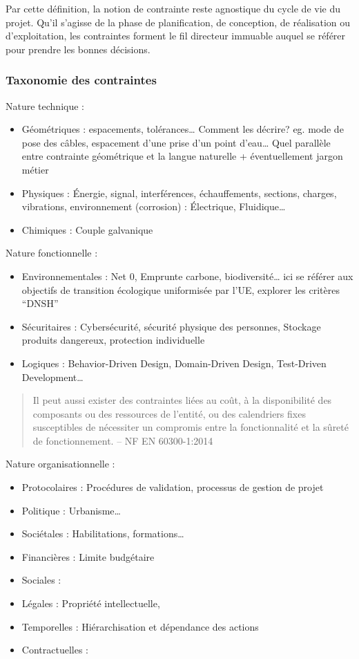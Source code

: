 \documentclass[a4paper,12pt]{article}
\begin{document}
Par cette définition, la notion de contrainte reste agnostique du cycle de vie du projet. Qu’il s’agisse de la phase de planification, de conception, de réalisation ou d’exploitation, les contraintes forment le fil directeur immuable auquel se référer pour prendre les bonnes décisions.
\subsubsection{Taxonomie des contraintes}
\label{sec:org63207fa}
Nature technique :
\begin{itemize}
\item Géométriques : espacements, tolérances…
Comment les décrire? eg. mode de pose des câbles, espacement d’une prise d’un point d’eau…
Quel parallèle entre contrainte géométrique et la langue naturelle + éventuellement jargon métier
\item Physiques : Énergie, signal, interférences, échauffements, sections, charges, vibrations, environnement (corrosion) : Électrique, Fluidique…
\item Chimiques : Couple galvanique
\end{itemize}

Nature fonctionnelle :
\begin{itemize}
\item Environnementales : Net 0, Emprunte carbone, biodiversité… ici se référer aux objectifs de transition écologique uniformisée par l’UE, explorer les critères “DNSH”
\item Sécuritaires : Cybersécurité, sécurité physique des personnes, Stockage produits dangereux, protection individuelle
\item Logiques : Behavior-Driven Design, Domain-Driven Design, Test-Driven Development\ldots{}
\end{itemize}

\begin{quote}
Il peut aussi exister des contraintes liées au coût, à la disponibilité des composants ou des ressources de l’entité, ou des calendriers fixes susceptibles de nécessiter un compromis entre la fonctionnalité et la sûreté de fonctionnement. -- NF EN 60300-1:2014\autocite{GestionSureteFonctionnement2014}
\end{quote}

Nature organisationnelle :
\begin{itemize}
\item Protocolaires : Procédures de validation, processus de gestion de projet
\item Politique : Urbanisme\ldots{}
\item Sociétales :  Habilitations, formations\ldots{}
\item Financières : Limite budgétaire
\item Sociales :
\item Légales : Propriété intellectuelle,
\item Temporelles : Hiérarchisation et dépendance des actions
\item Contractuelles :
\end{itemize}
\end{document}
